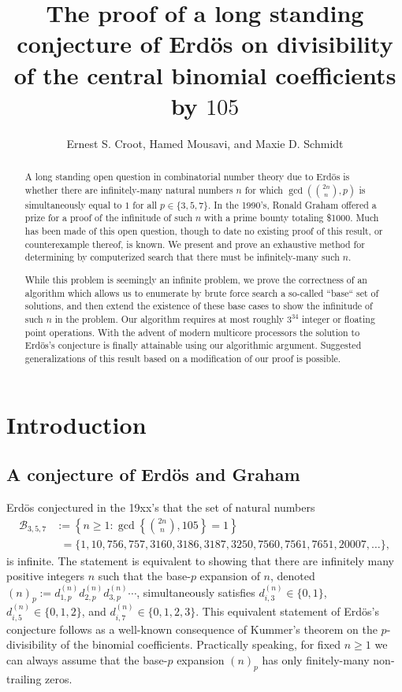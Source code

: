 \documentclass[12pt]{article}
\author{Ernest S. Croot, Hamed Mousavi, and Maxie D. Schmidt}
\title{The proof of a long standing conjecture of Erd\"os on divisibility of the 
       central binomial coefficients by $105$}
\begin{document}
\maketitle

\begin{abstract} 
A long standing open question in combinatorial number theory due to Erd\"os is whether there are 
infinitely-many natural numbers $n$ for which $\gcd(\binom{2n}{n}, p)$ is simultaneously equal to 
$1$ for all $p \in \{3,5,7\}$. In the 1990's, Ronald Graham offered a prize for a proof of the infinitude of such 
$n$ with a prime bounty totaling \$1000. Much has been made of this open question, though to date 
no existing proof of this result, or counterexample thereof, is known. We present and prove an 
exhaustive method for determining by computerized search that there must be infinitely-many such $n$. 

While this problem is seemingly an infinite problem, we prove the correctness of an algorithm which 
allows us to enumerate by brute force search a so-called ``base`` set of solutions, and then extend the 
existence of these base cases to show the infinitude of such $n$ in the problem. 
Our algorithm requires at most roughly $3^{34}$ integer or floating point operations. 
With the advent of modern multicore processors the solution to Erd\"os's conjecture is finally 
attainable using our algorithmic argument. 
Suggested generalizations of this result based on a modification of our proof is possible. 
\end{abstract} 

\section{Introduction} 

\subsection{A conjecture of Erd\"os and Graham} 

Erd\"os conjectured in the 19xx's that the set of natural numbers 
\begin{align*} 
\mathcal{B}_{3,5,7} & := \left\{n \geq 1: \gcd\left\{\binom{2n}{n}, 105\right\} = 1\right\} \\ 
     & \phantom{:}= 
     \{1,10,756,757,3160,3186,3187,3250,7560,7561,7651,20007,\ldots\}, 
\end{align*} 
is infinite. The statement is equivalent to showing that there are infinitely many positive integers 
$n$ such that the base-$p$ expansion of $n$, denoted 
$(n)_p := d_{1,p}^{(n)} d_{2,p}^{(n)} d_{3,p}^{(n)}\cdots$, simultaneously satisfies 
$d_{i,3}^{(n)} \in \{0,1\}$, $d_{i,5}^{(n)} \in \{0,1,2\}$, and $d_{i,7}^{(n)} \in \{0,1,2,3\}$. 
This equivalent statement of Erd\"os's conjecture follows as a well-known consequence of Kummer's theorem 
on the $p$-divisibility of the binomial coefficients. 
Practically speaking, for fixed $n \geq 1$ we can always assume that the base-$p$ expansion $(n)_p$ has only 
finitely-many non-trailing zeros. 
\end{document}
